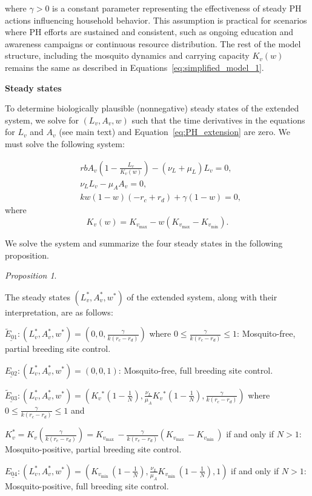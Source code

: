 \documentclass{article}
\theoremstyle{remark}
\theoremstyle{custom} %
\newtheorem{proposition}{Proposition}
\begin{document}
where $\gamma>0$ is a constant parameter representing the effectiveness of steady PH actions influencing household behavior. This assumption is practical for scenarios where PH efforts are sustained and consistent, such as ongoing education and awareness campaigns or continuous resource distribution.  The rest of the model structure, including the mosquito dynamics and carrying capacity \( K_v(w) \) remains the same as described in Equations~\eqref{eq:simplified_model_1}. 


\textbf{Steady states}

To determine biologically plausible (nonnegative) steady states of the extended system,  we solve for \( (L_v, A_v, w) \) such that the time derivatives in the equations for $L_v$ and $A_v$ (see main text) and Equation~\eqref{eq:PH_extension} are zero. We must solve the following system:

\[
\begin{aligned}
& rb A_v \left(1 - \frac{L_v}{K_v(w)}\right) - (\nu_L + \mu_L) L_v = 0, \\
& \nu_L L_v - \mu_A A_v = 0, \\
& kw(1 - w)(-r_c + r_d) + \gamma(1 - w) = 0,
\end{aligned}
\]
where
\[
K_v(w) = K_{v_{\max}} - w(K_{v_{\max}} - K_{v_{\min}}).
\]


We solve the system and summarize the four steady states in the following proposition. 


\begin{proposition}\label{prop: Model with PH Intervention}

The steady states $\left(L_v^*, A_v^*, w^*\right)$ of the extended system, along with their interpretation, are as follows:

$\underline{\tilde{E}_{01}}:\left(L_v^*, A_v^*, w^*\right)=\left(0,0, \frac{\gamma}{k\left(r_c-r_d\right)}\right)$ where $0 \leq \frac{\gamma}{k\left(r_c-r_d\right)} \leq 1$: Mosquito-free, partial breeding site control.

$\underline{E_{02}}:\left(L_v^*, A_v^*, w^*\right)=(0,0,1)$: Mosquito-free, full breeding site control.

$\underline{\tilde{E}_{03}}:\left(L_v^*, A_v^*, w^*\right)=\left(K_v{ }^*\left(1-\frac{1}{N}\right), \frac{\nu_L}{\mu_A} K_v{ }^*\left(1-\frac{1}{N}\right), \frac{\gamma}{k\left(r_c-r_d\right)}\right)$ where $0 \leq \frac{\gamma}{k\left(r_c-r_d\right)} \leq 1$ and 

$K_v^*=K_v\left(\frac{\gamma}{k\left(r_e-r_d\right)}\right)=K_{v_{\text {max }}}-\frac{\gamma}{k\left(r_e-r_d\right)}\left(K_{v_{\text {max }}}-K_{v_{\text {min }}}\right)$ if and only if $N>1$: Mosquito-positive, partial breeding site control. 

$\underline{E_{04}:}\left(L_v^*, A_v^*, w^*\right)=\left(K_{v_{\text {min }}}\left(1-\frac{1}{N}\right), \frac{\nu_L}{\mu_A} K_{v_{\text {min }}}\left(1-\frac{1}{N}\right), 1\right)$ if and only if $N>1$: Mosquito-positive, full breeding site control.


\end{proposition}
\end{document}
